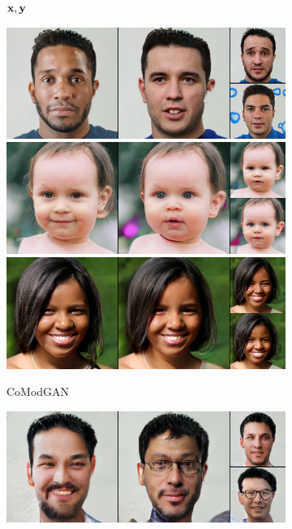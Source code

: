 \begin{figure}[t]
\begin{subfigure}[t]{0.22\textwidth}
      \caption*{${\mathbf{x}}, {\mathbf{y}}$}
    \end{subfigure}
    \begin{subfigure}[t]{0.25\textwidth}
      \centering
      \includegraphics[height=\ffhqimgheight]{figs/cigcvae/image-samples/ffhq256/freeform_co_mod_gan_0_samples.jpg}
      \includegraphics[height=\ffhqimgheight]{figs/cigcvae/image-samples/ffhq256/freeform_co_mod_gan_13_samples.jpg}
      \includegraphics[height=\ffhqimgheight]{figs/cigcvae/image-samples/ffhq256/freeform_co_mod_gan_32_samples.jpg}
      \caption{CoModGAN}
    \end{subfigure}
    \begin{subfigure}[t]{0.25\textwidth}
      \centering
      \includegraphics[height=\ffhqimgheight]{figs/cigcvae/image-samples/ffhq256/freeform_pic_0_samples.jpg}

\end{subfigure}
\end{figure}
